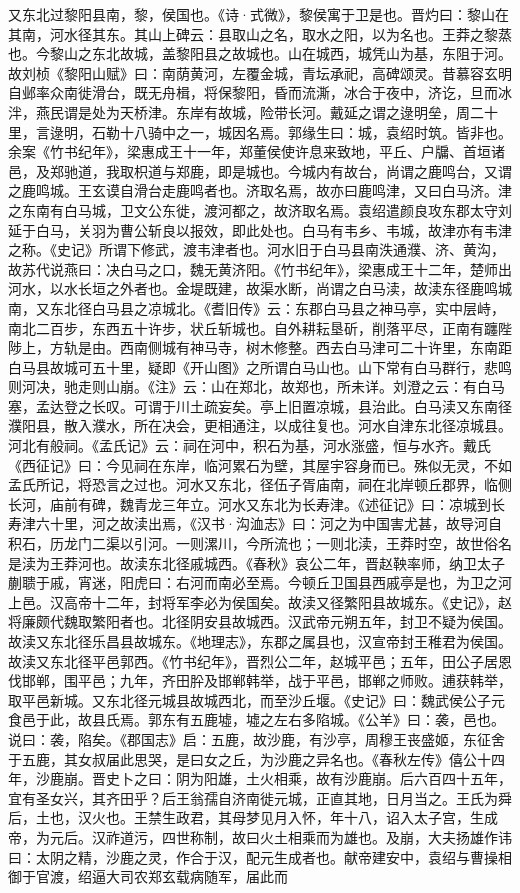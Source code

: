 \documentclass[12pt,UTF8]{ctexbook}
\begin{document}
又东北过黎阳县南，黎，侯国也。《诗·式微》，黎侯寓于卫是也。晋灼曰：黎山在其南，河水径其东。其山上碑云：县取山之名，取水之阳，以为名也。王莽之黎蒸也。今黎山之东北故城，盖黎阳县之故城也。山在城西，城凭山为基，东阻于河。故刘桢《黎阳山赋》曰：南荫黄河，左覆金城，青坛承祀，高碑颂灵。昔慕容玄明自邺率众南徙滑台，既无舟楫，将保黎阳，昏而流澌，冰合于夜中，济讫，旦而冰泮，燕民谓是处为天桥津。东岸有故城，险带长河。戴延之谓之逯明垒，周二十里，言逯明，石勒十八骑中之一，城因名焉。郭缘生曰：城，袁绍时筑。皆非也。余案《竹书纪年》，梁惠成王十一年，郑董侯使许息来致地，平丘、户牖、首垣诸邑，及郑驰道，我取枳道与郑鹿，即是城也。今城内有故台，尚谓之鹿鸣台，又谓之鹿鸣城。王玄谟自滑台走鹿鸣者也。济取名焉，故亦曰鹿鸣津，又曰白马济。津之东南有白马城，卫文公东徙，渡河都之，故济取名焉。袁绍遣颜良攻东郡太守刘延于白马，关羽为曹公斩良以报效，即此处也。白马有韦乡、韦城，故津亦有韦津之称。《史记》所谓下修武，渡韦津者也。河水旧于白马县南泆通濮、济、黄沟，故苏代说燕曰：决白马之口，魏无黄济阳。《竹书纪年》，梁惠成王十二年，楚师出河水，以水长垣之外者也。金堤既建，故渠水断，尚谓之白马渎，故渎东径鹿鸣城南，又东北径白马县之凉城北。《耆旧传》云：东郡白马县之神马亭，实中层峙，南北二百步，东西五十许步，状丘斩城也。自外耕耘垦斫，削落平尽，正南有躔陛陟上，方轨是由。西南侧城有神马寺，树木修整。西去白马津可二十许里，东南距白马县故城可五十里，疑即《开山图》之所谓白马山也。山下常有白马群行，悲鸣则河决，驰走则山崩。《注》云：山在郑北，故郑也，所未详。刘澄之云：有白马塞，孟达登之长叹。可谓于川土疏妄矣。亭上旧置凉城，县治此。白马渎又东南径濮阳县，散入濮水，所在决会，更相通注，以成往复也。河水自津东北径凉城县。河北有般祠。《孟氏记》云：祠在河中，积石为基，河水涨盛，恒与水齐。戴氏《西征记》曰：今见祠在东岸，临河累石为壁，其屋宇容身而已。殊似无灵，不如孟氏所记，将恐言之过也。河水又东北，径伍子胥庙南，祠在北岸顿丘郡界，临侧长河，庙前有碑，魏青龙三年立。河水又东北为长寿津。《述征记》曰：凉城到长寿津六十里，河之故渎出焉，《汉书·沟洫志》曰：河之为中国害尤甚，故导河自积石，历龙门二渠以引河。一则漯川，今所流也；一则北渎，王莽时空，故世俗名是渎为王莽河也。故渎东北径戚城西。《春秋》哀公二年，晋赵鞅率师，纳卫太子蒯聩于戚，宵迷，阳虎曰：右河而南必至焉。今顿丘卫国县西戚亭是也，为卫之河上邑。汉高帝十二年，封将军李必为侯国矣。故渎又径繁阳县故城东。《史记》，赵将廉颇代魏取繁阳者也。北径阴安县故城西。汉武帝元朔五年，封卫不疑为侯国。故渎又东北径乐昌县故城东。《地理志》，东郡之属县也，汉宣帝封王稚君为侯国。故渎又东北径平邑郭西。《竹书纪年》，晋烈公二年，赵城平邑；五年，田公子居恩伐邯郸，围平邑；九年，齐田肸及邯郸韩举，战于平邑，邯郸之师败。逋获韩举，取平邑新城。又东北径元城县故城西北，而至沙丘堰。《史记》曰：魏武侯公子元食邑于此，故县氏焉。郭东有五鹿墟，墟之左右多陷城。《公羊》曰：袭，邑也。说曰：袭，陷矣。《郡国志》启：五鹿，故沙鹿，有沙亭，周穆王丧盛姬，东征舍于五鹿，其女叔届此思哭，是曰女之丘，为沙鹿之异名也。《春秋左传》僖公十四年，沙鹿崩。晋史卜之曰：阴为阳雄，土火相乘，故有沙鹿崩。后六百四十五年，宜有圣女兴，其齐田乎？后王翁孺自济南徙元城，正直其地，日月当之。王氏为舜后，土也，汉火也。王禁生政君，其母梦见月入怀，年十八，诏入太子宫，生成帝，为元后。汉祚道污，四世称制，故曰火土相乘而为雄也。及崩，大夫扬雄作讳曰：太阴之精，沙鹿之灵，作合于汉，配元生成者也。献帝建安中，袁绍与曹操相御于官渡，绍逼大司农郑玄载病随军，届此而
\end{document}
